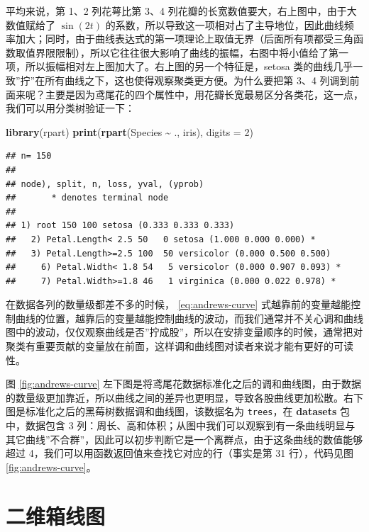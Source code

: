 \documentclass[
  b5paper,
  UTF8,twoside]{book}
\newenvironment{Shaded}{\begin{snugshade}}{\end{snugshade}}
\newcommand{\AttributeTok}[1]{\textcolor[rgb]{0.13,0.29,0.53}{#1}}
\newcommand{\DecValTok}[1]{\textcolor[rgb]{0.00,0.00,0.81}{#1}}
\newcommand{\FunctionTok}[1]{\textcolor[rgb]{0.13,0.29,0.53}{\textbf{#1}}}
\newcommand{\NormalTok}[1]{#1}
\newcommand{\SpecialCharTok}[1]{\textcolor[rgb]{0.81,0.36,0.00}{\textbf{#1}}}
\begin{document}
平均来说，第 1、2 列花萼比第 3、4 列花瓣的长宽数值要大，右上图中，由于大数值赋给了 \(\sin(2t)\) 的系数，所以导致这一项相对占了主导地位，因此曲线频率加大；同时，由于曲线表达式的第一项理论上取值无界（后面所有项都受三角函数取值界限限制），所以它往往很大影响了曲线的振幅，右图中将小值给了第一项，所以振幅相对左上图加大了。右上图的另一个特征是，setosa 类的曲线几乎一致''拧''在所有曲线之下，这也使得观察聚类更方便。为什么要把第 3、4 列调到前面来呢？主要是因为鸢尾花的四个属性中，用花瓣长宽最易区分各类花，这一点，我们可以用分类树验证一下：

\begin{Shaded}
\begin{Highlighting}[]
\FunctionTok{library}\NormalTok{(rpart)}
\FunctionTok{print}\NormalTok{(}\FunctionTok{rpart}\NormalTok{(Species }\SpecialCharTok{\textasciitilde{}}\NormalTok{ ., iris), }\AttributeTok{digits =} \DecValTok{2}\NormalTok{)}
\end{Highlighting}
\end{Shaded}

\begin{verbatim}
## n= 150 
## 
## node), split, n, loss, yval, (yprob)
##       * denotes terminal node
## 
## 1) root 150 100 setosa (0.333 0.333 0.333)  
##   2) Petal.Length< 2.5 50   0 setosa (1.000 0.000 0.000) *
##   3) Petal.Length>=2.5 100  50 versicolor (0.000 0.500 0.500)  
##     6) Petal.Width< 1.8 54   5 versicolor (0.000 0.907 0.093) *
##     7) Petal.Width>=1.8 46   1 virginica (0.000 0.022 0.978) *
\end{verbatim}

在数据各列的数量级都差不多的时候， \eqref{eq:andrews-curve} 式越靠前的变量越能控制曲线的位置，越靠后的变量越能控制曲线的波动，而我们通常并不关心调和曲线图中的波动，仅仅观察曲线是否''拧成股''，所以在安排变量顺序的时候，通常把对聚类有重要贡献的变量放在前面，这样调和曲线图对读者来说才能有更好的可读性。

图 \ref{fig:andrews-curve}
左下图是将鸢尾花数据标准化之后的调和曲线图，由于数据的数量级更加靠近，所以曲线之间的差异也更明显，导致各股曲线更加松散。右下图是标准化之后的黑莓树数据调和曲线图，该数据名为 \texttt{trees}，在 \textbf{datasets} 包中，数据包含 3 列：周长、高和体积；从图中我们可以观察到有一条曲线明显与其它曲线''不合群''，因此可以初步判断它是一个离群点，由于这条曲线的数值能够超过 4，我们可以用函数返回值来查找它对应的行（事实是第 31 行），代码见图 \ref{fig:andrews-curve}。

\section{二维箱线图}\label{sec:bagplot}
\end{document}
